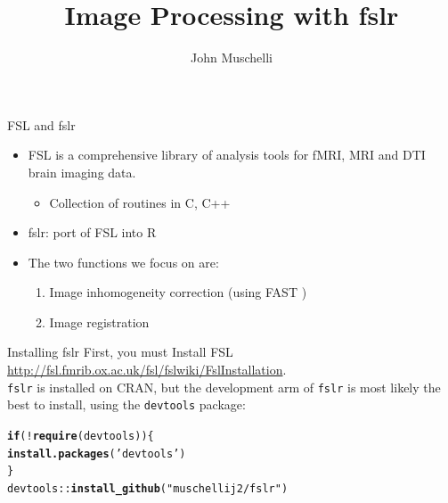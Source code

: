 \documentclass[11pt]{beamer}\usepackage[]{graphicx}\usepackage[]{color}
\author{John Muschelli}
\title{Image Processing with fslr}
\institute{Johns Hopkins Bloomberg School of Public Health}
\makeatletter
\newcommand{\hlstr}[1]{\textcolor[rgb]{0.192,0.494,0.8}{#1}}%
\newcommand{\hlopt}[1]{\textcolor[rgb]{0,0,0}{#1}}%
\newcommand{\hlstd}[1]{\textcolor[rgb]{0.345,0.345,0.345}{#1}}%
\newcommand{\hlkwa}[1]{\textcolor[rgb]{0.161,0.373,0.58}{\textbf{#1}}}%
\newcommand{\hlkwd}[1]{\textcolor[rgb]{0.737,0.353,0.396}{\textbf{#1}}}%
\newenvironment{kframe}{%
 \def\at@end@of@kframe{}%
 \ifinner\ifhmode%
  \def\at@end@of@kframe{\end{minipage}}%
  \begin{minipage}{\columnwidth}%
 \fi\fi%
 \def\FrameCommand##1{\hskip\@totalleftmargin \hskip-\fboxsep
 \colorbox{shadecolor}{##1}\hskip-\fboxsep
     \hskip-\linewidth \hskip-\@totalleftmargin \hskip\columnwidth}%
 \MakeFramed {\advance\hsize-\width
   \@totalleftmargin\z@ \linewidth\hsize
   \@setminipage}}%
 {\par\unskip\endMakeFramed%
 \at@end@of@kframe}
\newenvironment{knitrout}{}{} %
\makeatother
\begin{document}
\begin{frame}
\titlepage
\end{frame}





\begin{frame}[fragile]{FSL and fslr}

\begin{itemize}
\item FSL is a comprehensive library of analysis tools for fMRI, MRI and DTI brain imaging data. 
	\begin{itemize}
	\item Collection of routines in C, C++
	\end{itemize}
\item fslr: port of FSL into R
\item The two functions we focus on are: 
\begin{enumerate}
\item Image inhomogeneity correction (using FAST \citep{zhang2001segmentation})
\item Image registration
\end{enumerate} 
\end{itemize}

\end{frame}


\begin{frame}[fragile]{Installing fslr}
First, you must Install FSL \href{http://fsl.fmrib.ox.ac.uk/fsl/fslwiki/FslInstallation}{http://fsl.fmrib.ox.ac.uk/fsl/fslwiki/FslInstallation}.  \\
\vspace{0.5cm}
\verb|fslr| is installed on CRAN, but the development arm of \verb|fslr| is most likely the best to install, using the \verb|devtools| package:

\begin{knitrout}
\color{fgcolor}\begin{kframe}
\begin{alltt}
\hlkwa{if} \hlstd{(}\hlopt{!}\hlkwd{require}\hlstd{(devtools))\{}
        \hlkwd{install.packages}\hlstd{(}\hlstr{'devtools'}\hlstd{)}
\hlstd{\}}
\hlstd{devtools}\hlopt{::}\hlkwd{install_github}\hlstd{(}\hlstr{"muschellij2/fslr"}\hlstd{)}
\end{alltt}
\end{kframe}
\end{knitrout}
\end{frame}
\end{document}
